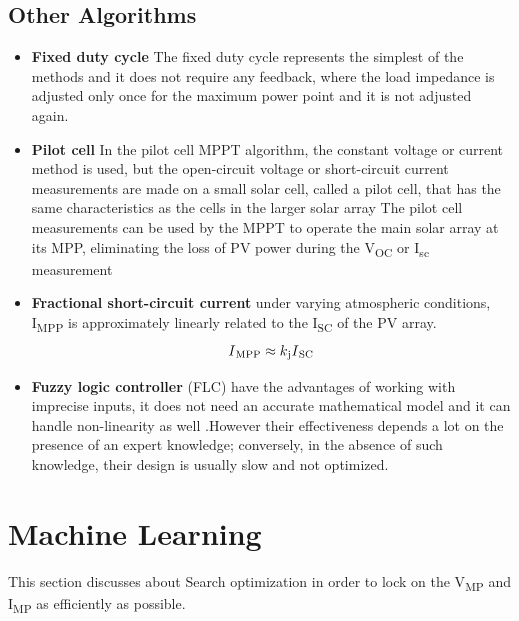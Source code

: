 {\subsection{Other Algorithms}
  \begin{itemize}
  \item {\bf Fixed duty cycle} The fixed duty cycle represents the simplest of the methods and it does not require any feedback, where the load impedance is adjusted only once for the maximum power point and it is not adjusted again.
  \item {\bf Pilot cell} In the pilot cell MPPT algorithm, the constant voltage or current method is used, but the open-circuit voltage or short-circuit current measurements are made on a small solar cell, called a pilot cell, that has the same characteristics as the cells in the larger solar array The pilot cell measurements can be used by the MPPT to operate the main solar array at its MPP, eliminating the loss of PV power during the V\textsubscript{OC} or I\textsubscript{sc} measurement
  \item {\bf Fractional short-circuit current }  under varying atmospheric conditions, I\textsubscript{MPP} is approximately linearly related to the I\textsubscript{SC} of the PV array. \newline
    \begin{equation}
      \begin{aligned}
    I\textsubscript{MPP} \approx k\textsubscript{j}I\textsubscript{SC}
    \label{eq:equ_fracoc}
    \end{aligned}
    \end{equation}
   \item {\bf Fuzzy logic controller} (FLC) have the advantages of working with imprecise inputs, it does not need an accurate mathematical model and it can handle non-linearity as well \cite{messai2011maximum}.However their effectiveness depends a lot on the presence of an expert knowledge; conversely, in the absence of such knowledge, their design is usually slow and not optimized. 
  \end{itemize} 
  







\section{Machine Learning }
This section discusses about Search optimization in order to lock on the  V\textsubscript{MP} and I\textsubscript{MP} as efficiently as possible.\\

}
